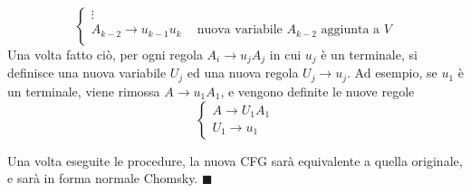 \documentclass[10pt, letterpaper]{report}
\begin{document}
\begin{itemize}
$$\begin{cases}
        \vdots \\ 
        A_{k-2}\longrightarrow u_{k-1}u_k \ \ \ \ \text{ nuova variabile $A_{k-2}$ aggiunta a $V$}\\ 
    \end{cases} $$
    Una volta fatto ciò, per ogni regola $A_i\longrightarrow u_jA_j$ in cui $u_j$ è un 
    terminale, si definisce una nuova variabile $U_j$ ed una 
    nuova regola $U_j\longrightarrow u_j$. Ad esempio, se $u_1$ è un terminale, viene rimossa $A\longrightarrow u_1A_1$, 
    e vengono definite le nuove regole $$\begin{cases}
        A\longrightarrow U_1A_1\\ 
        U_1\longrightarrow u_1
    \end{cases}$$ 
\end{itemize}
Una volta eseguite le procedure, la nuova CFG sarà equivalente a quella originale, e sarà in forma normale Chomsky. $\blacksquare$ 
\end{document}
